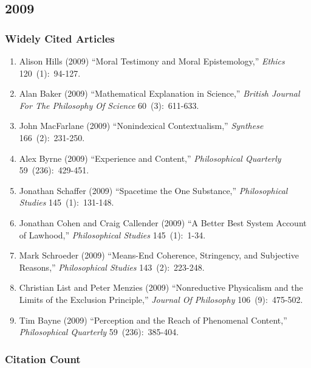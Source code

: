 \documentclass[
  10pt,
  letterpaper,
  DIV=11,
  numbers=noendperiod,
  twoside]{scrartcl}
\providecommand{\tightlist}{%
  \setlength{\itemsep}{0pt}\setlength{\parskip}{0pt}}\usepackage{longtable,booktabs,array}
\begin{document}
\newpage

\subsection{2009}\label{sec-s2009}

\subsubsection*{Widely Cited Articles}\label{widely-cited-articles-52}

\begin{enumerate}
\def\labelenumi{\arabic{enumi}.}
\tightlist
\item
  Alison Hills (2009) ``Moral Testimony and Moral Epistemology,''
  \emph{Ethics} 120~(1):~94-127.
\item
  Alan Baker (2009) ``Mathematical Explanation in Science,''
  \emph{British Journal For The Philosophy Of Science} 60~(3):~611-633.
\item
  John MacFarlane (2009) ``Nonindexical Contextualism,'' \emph{Synthese}
  166~(2):~231-250.
\item
  Alex Byrne (2009) ``Experience and Content,'' \emph{Philosophical
  Quarterly} 59~(236):~429-451.
\item
  Jonathan Schaffer (2009) ``Spacetime the One Substance,''
  \emph{Philosophical Studies} 145~(1):~131-148.
\item
  Jonathan Cohen and Craig Callender (2009) ``A Better Best System
  Account of Lawhood,'' \emph{Philosophical Studies} 145~(1):~1-34.
\item
  Mark Schroeder (2009) ``Means-End Coherence, Stringency, and
  Subjective Reasons,'' \emph{Philosophical Studies} 143~(2):~223-248.
\item
  Christian List and Peter Menzies (2009) ``Nonreductive Physicalism and
  the Limits of the Exclusion Principle,'' \emph{Journal Of Philosophy}
  106~(9):~475-502.
\item
  Tim Bayne (2009) ``Perception and the Reach of Phenomenal Content,''
  \emph{Philosophical Quarterly} 59~(236):~385-404.
\end{enumerate}

\subsubsection*{Citation Count}\label{sec-count-2009}
\end{document}

